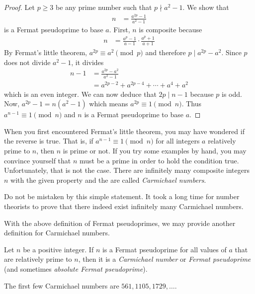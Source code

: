\documentclass{subfile}
\begin{document}
		\begin{proof}
			Let $p\geq 3$ be any prime number such that $p \nmid a^2-1$. We show that
				\begin{align*}
					n
						& = \frac{a^{2p}-1}{a^2-1}
				\end{align*}
			is a Fermat pseudoprime to base $a$. First, $n$ is composite because
				\begin{align*}
					n
						& = \frac{a^p-1}{a-1}\cdot \frac{a^p+1}{a+1}
				\end{align*}
			By Fermat's little theorem, $a^{2p} \equiv a^2 \pmod p$ and therefore $p\mid a^{2p}-a^2$. Since $p$ does not divide $a^2-1$, it divides
				\begin{align*}
					n-1
						& = \frac{a^{2p}-a^2}{a^2-1}\\
						& = a^{2p-2}+a^{2p-4}+\cdots+a^4+a^2
				\end{align*}
			which is an even integer. We can now deduce that $2p \mid n-1$ because $p$ is odd. Now, $a^{2p}-1 = n\left(a^2-1\right)$ which means $a^{2p} \equiv 1 \pmod n$. Thus $a^{n-1}\equiv 1 \pmod n$ and $n$ is a Fermat pseudoprime to base $a$.
		\end{proof}
	When you first encountered Fermat's little theorem, you may have wondered if the reverse is true. That is, if $a^{n-1}\equiv 1\pmod n$ for all integers $a$ relatively prime to $n$, then $n$ is prime or not. If you try some examples by hand, you may convince yourself that $n$ must be a prime in order to hold the condition true. Unfortunately, that is not the case. There are infinitely many composite integers $n$ with the given property and the are called \textit{Carmichael numbers}.
	\begin{note}
		Do not be mistaken by this simple statement. It took a long time for number theorists to prove that there indeed exist infinitely many Carmichael numbers.
	\end{note}
	With the above definition of Fermat pseudoprimes, we may provide another definition for Carmichael numbers.

		\begin{definition}
			Let $n$ be a positive integer. If $n$ is a Fermat pseudoprime for all values of $a$ that are relatively prime to $n$, then it is a \textit{Carmichael number} or \textit{Fermat pseudoprime} (and sometimes \textit{absolute Fermat pseudoprime}).
		\end{definition}

	The first few Carmichael numbers are $561, 1105, 1729, \dots$.
\end{document}
